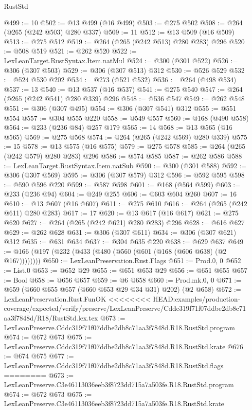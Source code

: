 \begin{lexlean}{RustStd}
\begin{coremodule}
{\begin{coremodule}
{{{{{{{{{@499 := 10
@502 := @13 @499 (@16 @499)
@503 := @275 @502
@508 := @264 (@265 (@242 @503) @280 @337)
@509 := 11
@512 := @13 @509 (@16 @509)
@513 := @275 @512
@519 := @264 (@265 (@242 @513) @280 @283) @296
@520 := @508 @519
@521 := @262 @520
@522 := LexLeanTarget.RustSyntax.Item.natMul
@524 := @300 (@301 @522)
@526 := @306 (@307 @503)
@529 := @306 (@307 @513) @312
@530 := @526 @529
@532 := @524 @530 @202
@534 := @273 (@521 @532)
@536 := @264 (@498 @534)
@537 := 13
@540 := @13 @537 (@16 @537)
@541 := @275 @540
@547 := @264 (@265 (@242 @541) @280 @339) @296
@548 := @536 @547
@549 := @262 @548
@551 := @306 (@307 @495)
@554 := @306 (@307 @541) @312
@555 := @551 @554
@557 := @304 @555 @220
@558 := @549 @557
@560 := @168 (@490 @558)
@564 := @233 (@236 @84) @257 @179
@565 := 14
@568 := @13 @565 (@16 @565)
@569 := @275 @568
@574 := @264 (@265 (@242 @569) @280 @339)
@575 := 15
@578 := @13 @575 (@16 @575)
@579 := @275 @578
@585 := @264 (@265 (@242 @579) @280 @283) @296
@586 := @574 @585
@587 := @262 @586
@588 := LexLeanTarget.RustSyntax.Item.natSub
@590 := @300 (@301 @588)
@592 := @306 (@307 @569)
@595 := @306 (@307 @579) @312
@596 := @592 @595
@598 := @590 @596 @220
@599 := @587 @598
@601 := @168 (@564 @599)
@603 := @233 (@236 @94)
@604 := @249 @255
@606 := @603 @604 @260
@607 := 16
@610 := @13 @607 (@16 @607)
@611 := @275 @610
@616 := @264 (@265 (@242 @611) @280 @283)
@617 := 17
@620 := @13 @617 (@16 @617)
@621 := @275 @620
@627 := @264 (@265 (@242 @621) @280 @283) @296
@628 := @616 @627
@629 := @262 @628
@631 := @306 (@307 @611)
@634 := @306 (@307 @621) @312
@635 := @631 @634
@637 := @304 @635 @220
@638 := @629 @637
@649 := @166 (@197 (@232 (@433 (@480 (@560 (@601 (@168 (@606 @638) (@2 @167))))))))
@650 := LexLeanPreservation.Rust.Flags
@651 := Prod.{0, 0}
@652 := List.{0}
@653 := @652 @29
@655 := @651 @653 @29
@656 := @651 @655
@657 := Bool
@658 := @656 @657
@659 := @6 @658
@660 := Prod.mk.{0, 0}
@671 := @659 (@660 @655 @657 (@660 @653 @29 @34 @31) @202) (@2 @658)
@672 := LexLeanPreservation.Rust.FunOK
<<<<<<<< HEAD:examples/production-coverage/expected/verify/preserve/LexLeanPreserve/Cddc319f71f07ddbe2db8c71aa3f7848d/R18/RustStd.lex.tex
@673 := LexLeanPreserve.Cddc319f71f07ddbe2db8c71aa3f7848d.R18.RustStd.program
@674 := @672 @673
@675 := LexLeanPreserve.Cddc319f71f07ddbe2db8c71aa3f7848d.R18.RustStd.krate
@676 := @674 @675
@677 := LexLeanPreserve.Cddc319f71f07ddbe2db8c71aa3f7848d.R18.RustStd.flags
========
@673 := LexLeanPreserve.C3e46113036eeb3f8723dd715a7a503fe.R18.RustStd.program
@674 := @672 @673
@675 := LexLeanPreserve.C3e46113036eeb3f8723dd715a7a503fe.R18.RustStd.krate
}}}}}}}}}
\end{coremodule}}
\end{coremodule}
\end{lexlean}
